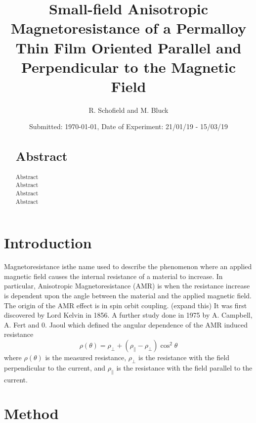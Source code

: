 \documentclass[10pt, twocolumn]{revtex4}
\begin{document}
\title{Small-field Anisotropic Magnetoresistance of a Permalloy Thin Film Oriented Parallel and Perpendicular to the Magnetic Field }
\date{Submitted: \today{}, Date of Experiment: 21/01/19 - 15/03/19}
\author{R. Schofield and M. Bluck}


\begin{abstract}
\section*{Abstract}

Abstract\\
Abstract\\
Abstract\\
Abstract


\end{abstract}

\maketitle
\thispagestyle{plain}


\section{Introduction}

Magnetoresistance isthe name used to describe the phenomenon where an applied magnetic field causes the internal resistance of a material to increase. In particular, Anisotropic Magnetoresistance (AMR) is when the resistance increase is dependent upon the angle between the material and the applied magnetic field. The origin  of the AMR effect is in spin orbit coupling\cite{Campbell_1970}. (expand this) It was first discovered by Lord Kelvin in 1856\cite{kelvinXIXElectrodynamicQualities1857}. A further study done in 1975 by A. Campbell, A. Fert and 0. Jaoul which defined the angular dependence of the AMR induced resistance
\begin{equation}
\rho(\theta) = \rho_\perp + (\rho_\parallel - \rho_\perp)\cos^2\theta
\end{equation}
where $\rho(\theta)$ is the measured resistance, $\rho_\perp$ is the resistance with the field perpendicular to the current, and $\rho_\parallel$ is the resistance with the field parallel to the current.\cite{mcguireAnisotropicMagnetoresistanceFerromagnetic1975} 


\section{Method}
\end{document}
